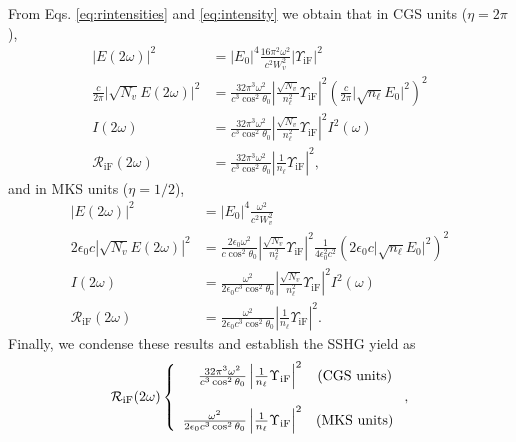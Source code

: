 \documentclass[aps,prb,10pt,showpacs,letterpaper,twocolumn]{revtex4-1}
\begin{document}
From Eqs. \eqref{eq:rintensities} and \eqref{eq:intensity} we obtain that in CGS
units ($\eta = 2\pi$),
\begin{align}\label{eq:r01}
\vert E(2\omega)\vert^{2} &=
\vert E_{0}\vert^{4}\frac{16\pi^{2}\omega^{2}}{c^{2}W^2_{v}}
\vert\Upsilon_{\mathrm{iF}}\vert^{2}\nonumber\\
\frac{c}{2\pi}\vert\sqrt{N_{v}}E(2\omega)\vert^{2} &=
\frac{32\pi^{3}\omega^{2}}{c^{3}\cos^2\theta_{0}}
\left\vert\frac{\sqrt{N_{v}}}{n^{2}_{\ell}}\Upsilon_{\mathrm{iF}}\right\vert^{2} 
\left(\frac{c}{2\pi}\vert\sqrt{n_{\ell}}E_{0}\vert^{2}\right)^{2}\nonumber\\ 
I(2\omega) &=
\frac{32\pi^{3}\omega^{2}}{c^{3}\cos^2\theta_{0}}
\left\vert\frac{\sqrt{N_{v}}}{n^{2}_{\ell}}\Upsilon_{\mathrm{iF}}\right\vert^{2}
I^{2}(\omega)\nonumber\\
\mathcal{R}_{\mathrm{iF}}(2\omega) &=
\frac{32\pi^{3}\omega^{2}}{c^{3}\cos^2\theta_{0}}
\left\vert\frac{1}{n_{\ell}}\Upsilon_{\mathrm{iF}}\right\vert^{2},
\end{align} 
and in MKS units ($\eta=1/2$),
\begin{align}\label{r01m}
\vert E(2\omega)\vert^{2} &=
\vert E_{0}\vert^{4}\frac{\omega^{2}}{c^{2}W^{2}_{v}}\nonumber\\
2\epsilon_{0}c|\sqrt{N_{v}}E(2\omega)|^{2} &=
\frac{2\epsilon_{0}\omega^{2}}{c\cos^{2}\theta_{0}}
\left\vert\frac{\sqrt{N_{v}}}{n^{2}_{\ell}}\Upsilon_{\mathrm{iF}}\right\vert^{2} 
\frac{1}{4\epsilon^{2}_0c^{2}}
\left(2\epsilon_{0}c\vert\sqrt{n_{\ell}}E_{0}\vert^{2}\right)^{2}\nonumber\\
I(2\omega) &= 
\frac{\omega^{2}}{2\epsilon_{0}c^3\cos^{2}\theta_{0}}
\left\vert\frac{\sqrt{N_{v}}}{n^{2}_{\ell}}\Upsilon_{\mathrm{iF}}\right\vert^{2}
I^{2}(\omega)\nonumber\\
\mathcal{R}_{\mathrm{iF}}(2\omega) &=
\frac{\omega^{2}}{2\epsilon_{0}c^3\cos^{2}\theta_{0}}
\left\vert  \frac{1}{n_{\ell}}\Upsilon_{\mathrm{iF}}\right\vert^{2}.
\end{align}
Finally, we condense these results and establish the SSHG yield as
\begin{equation}\label{eq:mc6}
\mathcal{R}_{\mathrm{iF}}(2\omega) 
\left\{
\begin{array}{ r c } 
\frac{32\pi^{3}\omega^{2}}{c^{3}\cos^{2}\theta_{0}}
\left\vert\frac{1}{n_{\ell}}\Upsilon_{\mathrm{iF}}\right\vert^{2} 
& \text{(CGS units)} \\\\
\frac{\omega^{2}}{2\epsilon_{0}c^3\cos^{2}\theta_{0}}
\left\vert\frac{1}{n_{\ell}}\Upsilon_{\mathrm{iF}}\right\vert^{2} 
& \text{(MKS units)} 
\end{array}
\right.,
\end{equation}
\end{document}
